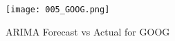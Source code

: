 \documentclass{article}
\begin{document}
\begin{figure}[h]
\centering
\texttt{[image: 005\_GOOG.png]}
\caption{ARIMA Forecast vs Actual for GOOG}
\label{fig:GOOG_forecast}
\end{figure}
\end{document}
